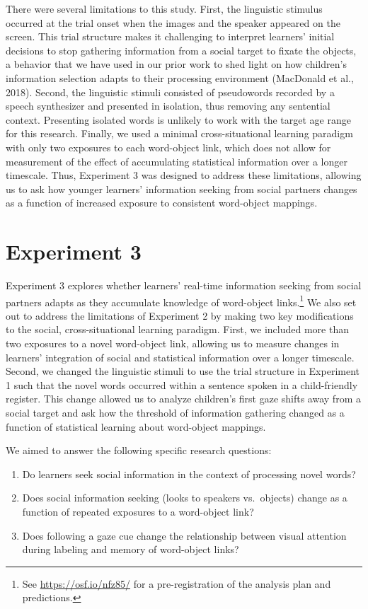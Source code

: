 \documentclass[man,floatsintext]{apa6}
\providecommand{\tightlist}{%
  \setlength{\itemsep}{0pt}\setlength{\parskip}{0pt}}
\let\rmarkdownfootnote\footnote%
\def\footnote{\protect\rmarkdownfootnote}
\begin{document}
There were several limitations to this study. First, the linguistic
stimulus occurred at the trial onset when the images and the speaker
appeared on the screen. This trial structure makes it challenging to
interpret learners' initial decisions to stop gathering information from
a social target to fixate the objects, a behavior that we have used in
our prior work to shed light on how children's information selection
adapts to their processing environment (MacDonald et al., 2018). Second,
the linguistic stimuli consisted of pseudowords recorded by a speech
synthesizer and presented in isolation, thus removing any sentential
context. Presenting isolated words is unlikely to work with the target
age range for this research. Finally, we used a minimal
cross-situational learning paradigm with only two exposures to each
word-object link, which does not allow for measurement of the effect of
accumulating statistical information over a longer timescale. Thus,
Experiment 3 was designed to address these limitations, allowing us to
ask how younger learners' information seeking from social partners
changes as a function of increased exposure to consistent word-object
mappings.

\section{Experiment 3}\label{experiment-3}

Experiment 3 explores whether learners' real-time information seeking
from social partners adapts as they accumulate knowledge of word-object
links.\footnote{See \url{https://osf.io/nfz85/} for a pre-registration
  of the analysis plan and predictions.} We also set out to address the
limitations of Experiment 2 by making two key modifications to the
social, cross-situational learning paradigm. First, we included more
than two exposures to a novel word-object link, allowing us to measure
changes in learners' integration of social and statistical information
over a longer timescale. Second, we changed the linguistic stimuli to
use the trial structure in Experiment 1 such that the novel words
occurred within a sentence spoken in a child-friendly register. This
change allowed us to analyze children's first gaze shifts away from a
social target and ask how the threshold of information gathering changed
as a function of statistical learning about word-object mappings.

We aimed to answer the following specific research questions:

\begin{enumerate}
\def\labelenumi{\arabic{enumi}.}
\tightlist
\item
  Do learners seek social information in the context of processing novel
  words?\\
\item
  Does social information seeking (looks to speakers vs.~objects) change
  as a function of repeated exposures to a word-object link?
\item
  Does following a gaze cue change the relationship between visual
  attention during labeling and memory of word-object links?
\end{enumerate}
\end{document}
